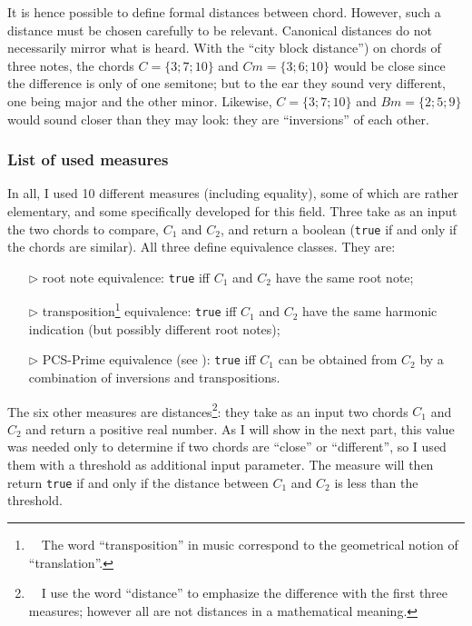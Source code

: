 \documentclass[a4paper,10pt]{article}
\newcommand{\guill}[1]{“#1”}
\begin{document}
It is hence possible to define formal distances between chord. However, such a distance must be chosen carefully to be relevant. Canonical distances do not necessarily mirror what is heard. With the \guill{city block distance}) on chords of three notes, the chords $C=\{3;7;10\}$ and $Cm=\{3;6;10\}$ would be close since the difference is only of one semitone; but to the ear they sound very different, one being major and the other minor. Likewise, $C=\{3;7;10\}$ and $Bm=\{2;5;9\}$ would sound closer than they may look: they are \guill{inversions} of each other.


\subsubsection{List of used measures}

In all, I used 10 different measures (including equality), some of which are rather elementary, and some specifically developed for this field. Three take as an input the two chords to compare, $C_1$ and $C_2$, and return a boolean (\texttt{true} if and only if the chords are similar). All three define equivalence classes. They are:

\begin{itemize}
\itemsep0em 
\item[$\triangleright$] root note equivalence: \texttt{true} iff $C_1$ and $C_2$ have the same root note;
\item[$\triangleright$] transposition\footnote{~~The word \guill{transposition} in music correspond to the geometrical notion of \guill{translation}.} 
equivalence: \texttt{true} iff $C_1$ and $C_2$ have the same harmonic indication (but possibly different root notes);
\item[$\triangleright$] PCS-Prime equivalence (see \cite{forte}): \texttt{true} iff $C_1$ can be obtained from $C_2$ by a combination of inversions and transpositions.
\end{itemize}

The six other measures are distances\footnote{~~I use the word \guill{distance} to emphasize the difference with the first three measures; however all are not distances in a mathematical meaning.}: they take as an input two chords $C_1$ and $C_2$ and return a positive real number. As I will show in the next part, this value was needed only to determine if two chords are \guill{close} or \guill{different}, so I used them with a threshold as additional input parameter. The measure will then return \texttt{true} if and only if the distance between $C_1$ and $C_2$ is less than the threshold.
\end{document}
